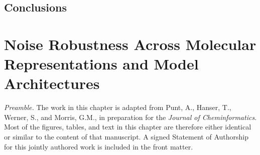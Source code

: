 \section{Conclusions}

\chapter{Noise Robustness Across Molecular Representations and Model Architectures}\label{chap:robustness}

\textit{Preamble.} The work in this chapter is adapted from Punt, A., Hanser, T., Werner, S., and Morris, G.M., in preparation for the \textit{Journal of Cheminformatics}. Most of the figures, tables, and text in this chapter are therefore either identical or similar to the content of that manuscript. A signed Statement of Authorship for this jointly authored work is included in the front matter.

